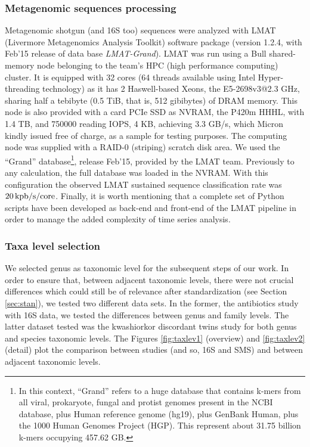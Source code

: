 \subsubsection*{Metagenomic sequences processing}
Metagenomic shotgun (and 16S too) sequences were analyzed with LMAT (Livermore Metagenomics Analysis Toolkit) software package\cite{LMAT} (version 1.2.4, with Feb'15 release of data base \emph{LMAT-Grand}). LMAT was run using a Bull shared-memory node belonging to the team's HPC (high performance computing) cluster. It is equipped with 32 cores (64 threads available using Intel Hyper-threading technology) as it has 2 Haswell-based Xeons, the E5-2698v3@2.3 GHz, sharing half a tebibyte (0.5 TiB, that is, 512 gibibytes) of DRAM memory. This node is also provided with a card PCIe SSD as NVRAM, the P420m HHHL, with 1.4 TB, and 750000 reading IOPS, 4 KB, achieving 3.3 GB/s, which Micron kindly issued free of charge, as a sample for testing purposes. The computing node was supplied with a RAID-0 (striping) scratch disk area. We used the ``Grand'' database\footnote{In this context, ``Grand'' refers to a huge database that contains k-mers from all viral, prokaryote, fungal and protist genomes present in the NCBI database, plus Human reference genome (hg19), plus GenBank Human, plus the 1000 Human Genomes Project (HGP). This represent about 31.75 billion k-mers occupying 457.62 GB.}, release Feb'15, provided by the LMAT team. Previously to any calculation, the full database was loaded in the NVRAM. With this configuration the observed LMAT sustained sequence classification rate was $20\operatorname{kpb/s/core}$. Finally, it is worth mentioning that a complete set of Python scripts have been developed as back-end and front-end of the LMAT pipeline in order to manage the added complexity of time series analysis. 

\subsubsection*{Taxa level selection}
We selected genus as taxonomic level for the subsequent steps of our work. In order to ensure that, between adjacent taxonomic levels, there were not crucial differences which could still be of relevance after standardization (see Section \ref{sec:stan}), we tested two different data sets. In the former, the antibiotics study\cite{antibiotic} with 16S data, we tested the differences between genus and family levels. The latter dataset tested was the kwashiorkor discordant twins study\cite{kwashiorkor} for both genus and species taxonomic levels. The Figures \ref{fig:taxlev1} (overview) and \ref{fig:taxlev2} (detail) plot the comparison between studies (and so, 16S and SMS) and between adjacent taxonomic levels.

